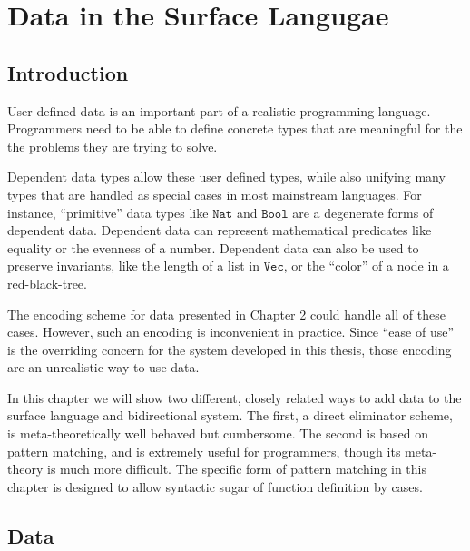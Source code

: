 \chapter{Data in the Surface Langugae}
\label{chapter:SurfaceData}
\thispagestyle{myheadings}

\section{Introduction}

User defined data is an important part of a realistic programming
language. Programmers need to be able to define concrete types that
are meaningful for the the problems they are trying to solve.

Dependent data types allow these user defined types, while also unifying
many types that are handled as special cases in most mainstream languages.
For instance, ``primitive'' data types like $\mathtt{Nat}$ and
$\mathtt{Bool}$ are a degenerate forms of dependent data. Dependent
data can represent mathematical predicates like equality or the evenness
of a number. Dependent data can also be used to preserve invariants,
like the length of a list in $\mathtt{Vec}$, or the ``color'' of
a node in a red-black-tree.

The encoding scheme for data presented in Chapter 2 could handle all
of these cases. However, such an encoding is inconvenient in practice.
Since ``ease of use'' is the overriding concern for the system developed
in this thesis, those encoding are an unrealistic way to use data.

In this chapter we will show two different, closely related ways to
add data to the surface language and bidirectional system. The first,
a direct eliminator scheme, is meta-theoretically well behaved but
cumbersome. The second is based on pattern matching, and is extremely
useful for programmers, though its meta-theory is much more difficult.
The specific form of pattern matching in this chapter is designed
to allow syntactic sugar of function definition by cases. 

\section{Data }


